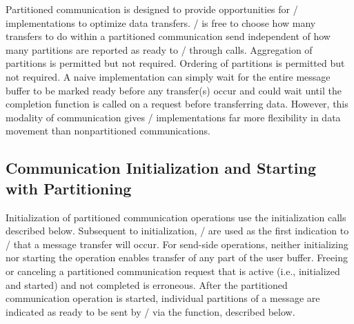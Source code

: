 \begin{rationale}
Partitioned communication is designed to provide opportunities for \MPI/ implementations to
optimize data transfers. \MPI/ is free to choose how many transfers to do within a partitioned communication send
independent of how many partitions are reported as ready to \MPI/ through
 calls.
Aggregation of partitions is permitted but not required.  Ordering of partitions  is permitted but not required.
A naive implementation can simply
wait for the entire message buffer to be marked ready before any transfer(s) occur and
could wait until the completion function is called on a request before transferring data.
However, this modality of communication gives \MPI/ implementations far more flexibility in data
movement than
nonpartitioned communications.
\end{rationale}

\subsection{Communication Initialization and Starting with Partitioning}
\label{sec:part_comm_init}
%
Initialization of partitioned communication operations use the initialization calls described below.
Subsequent to initialization, / are used as the first indication
to \MPI/ that a message transfer will occur.
For send-side operations,
neither initializing nor starting the operation enables 
transfer of any part of the user buffer.
Freeing or canceling a partitioned communication request that is active (i.e., initialized and
started) and not completed is erroneous.
After the partitioned communication operation is started, individual partitions of a 
message are indicated as ready to be sent by \MPI/ via the 
function, described below.

